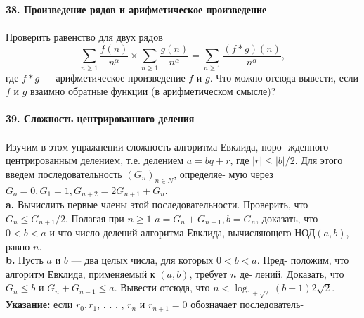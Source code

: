 \noindent\textbf{38. Произведение рядов и арифметическое произведение}\\\\
\hspace*{10pt} Проверить равенство для двух рядов
\begin{equation*}
\sum_{n\geq1}\frac{f(n)}{n^\alpha}\times \sum_{n\geq1}\frac{g(n)}{n^\alpha}=\sum_{n\geq1}\frac{(f*g)(n)}{n^\alpha},
\end{equation*}
где $f * g$ — арифметическое произведение $f$ и $g$. Что можно отсюда\linebreak
вывести, если $f$ и $g$ взаимно обратные функции (в арифметическом\linebreak
смысле)?
\\
\\
\noindent\textbf{39. Сложность центрированного деления}\\\\
\hspace*{10pt} Изучим в этом упражнении сложность алгоритма Евклида, поро-\linebreak
жденного центрированным делением, т.е. делением $a = bq + r$, где\linebreak
$|r|\leq|b|/2$. Для этого введем последовательность $(G_n )_{n\in N}$, определяе-\linebreak
мую через $G_o = 0, G_1 = 1, G_{n +2} = 2G_{n +1} + G_n$.\\
\hspace*{10pt}\textbf{a.} Вычислить первые члены этой последовательности. Проверить,\linebreak
что $G_n\leq G_{n+1}/2$. Полагая при $n \geq 1$ $a = G_n + G_{n - 1}, b = G_n$, доказать,\linebreak
что $0 < b < a$ и что число делений алгоритма Евклида, вычисляющего\linebreak
НОД$(a,b)$, равно $n$.\\
\hspace*{10pt}\textbf{b.} Пусть $a$ и $b$ — два целых числа, для которых $0 < b < a$. Пред-\linebreak
положим, что алгоритм Евклида, применяемый к $(a,b)$, требует $n$ де-\linebreak
лений. Доказать, что $G_n\leq b$ и $G_n + G_{n - 1} \leq a$. Вывести отсюда, что\linebreak
$n<\log_{1+\sqrt{2}}{(b+1)}2\sqrt{2}.$\\
\noindent\textbf{Указание:} если $r_0, r_1$, . . . , $r_{n}$ и $r_{n+1}= 0$ обозначает последователь-\linebreak 
